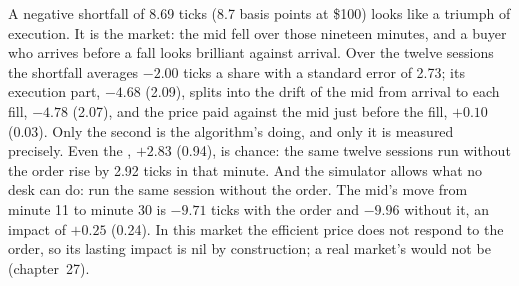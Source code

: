 A negative shortfall of 8.69 ticks (8.7 basis points at \$100) looks like a triumph of execution. It is the market: the mid fell over those nineteen minutes, and
a buyer who arrives before a fall looks brilliant against arrival. Over the twelve sessions the shortfall averages $-2.00$ ticks a share with a standard error of
2.73; its execution part, $-4.68$ (2.09), splits into the drift of the mid from arrival to each fill, $-4.78$ (2.07), and the price paid against the mid just
before the fill, $+0.10$ (0.03). Only the second is the algorithm's doing, and only it is measured precisely. Even the , $+2.83$ (0.94), is chance: the
same twelve sessions run without the order rise by 2.92 ticks in that minute. And the simulator allows what no desk can do: run the same session without the
order. The mid's move from minute 11 to minute 30 is $-9.71$ ticks with the order and $-9.96$ without it, an impact of $+0.25$ (0.24). In this market the efficient
price does not respond to the order, so its lasting impact is nil by construction; a real market's would not be (chapter~27).

\begin{omfigure}

\label{fig:rs:measuring-market-making-and-execution:tca}
\end{omfigure}

